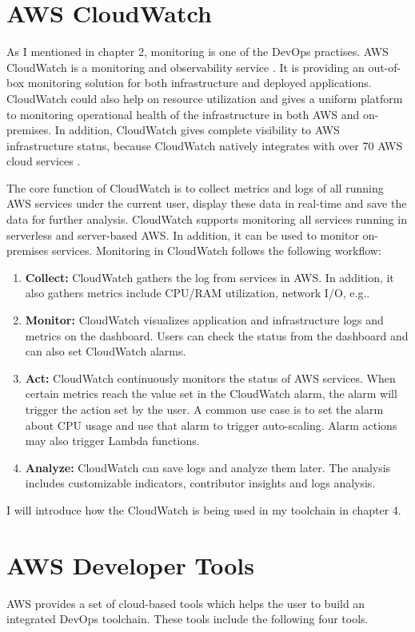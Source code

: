 \section{AWS CloudWatch}
As I mentioned in chapter 2, monitoring is one of the DevOps practises. AWS CloudWatch is a monitoring and observability service \cite{AmazonCl65:online}. It is providing an out-of-box monitoring solution for both infrastructure and deployed applications. CloudWatch could also help on resource utilization and gives a uniform platform to monitoring operational health of the infrastructure in both AWS and on-premises. In addition, CloudWatch gives complete visibility to AWS infrastructure status, because CloudWatch natively integrates with over 70 AWS cloud services \cite{AmazonCl65:online}.
\par
The core function of CloudWatch is to collect metrics and logs of all running AWS services under the current user, display these data in real-time and save the data for further analysis.
CloudWatch supports monitoring all services running in serverless and server-based AWS. In addition, it can be used to monitor on-premises services. Monitoring in CloudWatch follows the following workflow:
\begin{enumerate}
    \item \textbf{Collect:} CloudWatch gathers the log from services in AWS. In addition, it also gathers metrics include CPU/RAM utilization, network I/O, e.g..
    \item \textbf{Monitor:} CloudWatch visualizes application and infrastructure logs and metrics on the dashboard. Users can check the status from the dashboard and can also set CloudWatch alarms.
    \item \textbf{Act:} CloudWatch continuously monitors the status of AWS services.
    When certain metrics reach the value set in the CloudWatch alarm, the alarm will trigger the action set by the user. A common use case is to set the alarm about CPU usage and use that alarm to trigger auto-scaling. Alarm actions may also trigger Lambda functions.
    \item \textbf{Analyze:} CloudWatch can save logs and analyze them later. The analysis includes customizable indicators, contributor insights and logs analysis.
\end{enumerate}
I will introduce how the CloudWatch is being used in my toolchain in chapter 4.
\section{AWS Developer Tools}
AWS provides a set of cloud-based tools which helps the user to build an integrated DevOps toolchain. These tools include the following four tools.
